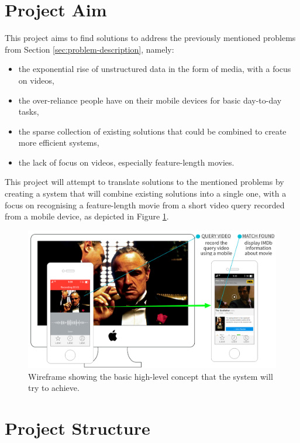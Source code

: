 \section{Project Aim}

This project aims to find solutions to address the previously mentioned problems from Section \ref{sec:problem-description}, namely:

\begin{itemize}
    \item the exponential rise of unstructured data in the form of media, with a focus on videos,
    \item the over-reliance people have on their mobile devices for basic day-to-day tasks,
    \item the sparse collection of existing solutions that could be combined to create more efficient systems,
    \item the lack of focus on videos, especially feature-length movies.
\end{itemize}

This project will attempt to translate solutions to the mentioned problems by creating a system that will combine existing solutions into a single one, with a focus on recognising a feature-length movie from a short video query recorded from a mobile device, as depicted in Figure \ref{fig:wireframe}.

\begin{figure}[ht]
\centerline{\includegraphics[width=1.15\textwidth]{figures/introduction/system_wireframe.png}}
\caption{\label{fig:wireframe}Wireframe showing the basic high-level concept that the system will try to achieve.}
\end{figure}

\section{Project Structure}

